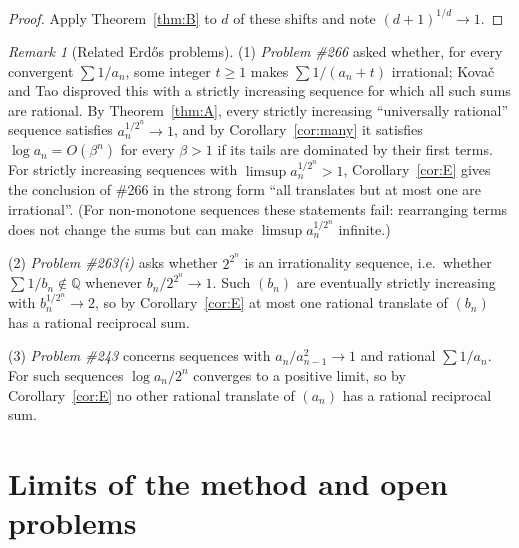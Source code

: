 \documentclass[11pt]{amsart}
\theoremstyle{definition}
\theoremstyle{remark}
\newtheorem{remark}[lemma]{Remark}
\newcommand{\Q}{\mathbb{Q}}
\begin{document}
\begin{proof}
Apply Theorem~\ref{thm:B} to $d$ of these shifts and note $(d+1)^{1/d}\to1$.
\end{proof}

\begin{remark}[Related Erd\H{o}s problems]\label{rem:related}
(1) \emph{Problem \#266} asked whether, for every convergent $\sum1/a_n$, some integer
$t\ge1$ makes $\sum1/(a_n+t)$ irrational; Kova\v{c} and Tao \cite{KT25} disproved this
with a strictly increasing sequence for which all such sums are rational. By
Theorem~\ref{thm:A}, every strictly increasing ``universally rational'' sequence satisfies
$a_n^{1/2^n}\to1$, and by Corollary~\ref{cor:many} it satisfies $\log a_n=O(\beta^n)$
for every $\beta>1$ if its tails are dominated by their first terms. For strictly
increasing sequences with $\limsup a_n^{1/2^n}>1$, Corollary~\ref{cor:E} gives the
conclusion of \#266 in the strong form ``all translates but at most one are
irrational''. (For non-monotone sequences these statements fail: rearranging terms does
not change the sums but can make $\limsup a_n^{1/2^n}$ infinite.)

(2) \emph{Problem \#263(i)} asks whether $2^{2^n}$ is an irrationality sequence, i.e.\
whether $\sum1/b_n\notin\Q$ whenever $b_n/2^{2^n}\to1$. Such $(b_n)$ are eventually
strictly increasing with $b_n^{1/2^n}\to2$, so by Corollary~\ref{cor:E} at most one
rational translate of $(b_n)$ has a rational reciprocal sum.

(3) \emph{Problem \#243} concerns sequences with $a_n/a_{n-1}^2\to1$ and rational
$\sum1/a_n$. For such sequences $\log a_n/2^n$ converges to a positive limit, so by
Corollary~\ref{cor:E} no other rational translate of $(a_n)$ has a rational reciprocal
sum.
\end{remark}

\section{Limits of the method and open problems}\label{sec:limits}
\end{document}
